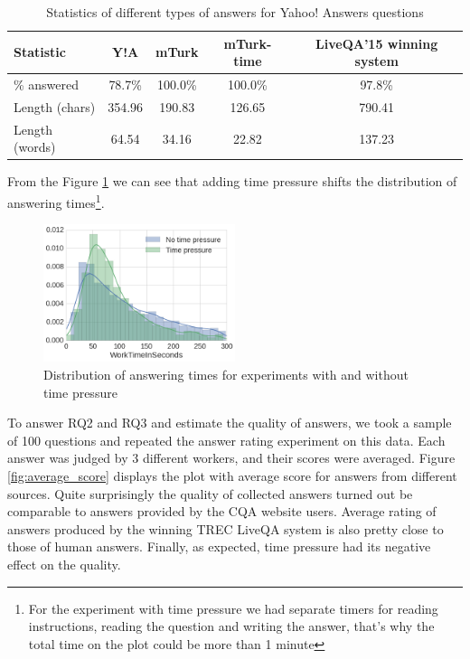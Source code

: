 \documentclass[11pt,letterpaper]{article}
\begin{document}
\begin{table}[h!t]
\centering
\caption{Statistics of different types of answers for Yahoo! Answers questions}
\begin{tabular}{| p{3cm} | c | c | c | c |}
\hline
Statistic & Y!A & mTurk & mTurk-time & LiveQA'15 winning system\\
\hline
\% answered & 78.7\% & 100.0\% & 100.0\% & 97.8\% \\
Length (chars) & 354.96 & 190.83 & 126.65 & 790.41 \\
Length (words) & 64.54 & 34.16 & 22.82 & 137.23 \\
\hline
\end{tabular}
\label{table:answer_stats}
\end{table}

From the Figure \ref{fig:answering_time_distribution} we can see that adding time pressure shifts the distribution of answering times\footnote{For the experiment with time pressure we had separate timers for reading instructions, reading the question and writing the answer, that's why the total time on the plot could be more than 1 minute}.

\begin{figure}[h]
	\centering
	\includegraphics[width=0.5\textwidth]{img/answering_time_distribution}
	\caption{Distribution of answering times for experiments with and without time pressure}
	\label{fig:answering_time_distribution}
\end{figure}

To answer RQ2 and RQ3 and estimate the quality of answers, we took a sample of 100 questions and repeated the answer rating experiment on this data.
Each answer was judged by 3 different workers, and their scores were averaged.
Figure \ref{fig:average_score} displays the plot with average score for answers from different sources.
Quite surprisingly the quality of collected answers turned out be comparable to answers provided by the CQA website users.
Average rating of answers produced by the winning TREC LiveQA system is also pretty close to those of human answers.
Finally, as expected, time pressure had its negative effect on the quality.
\end{document}
